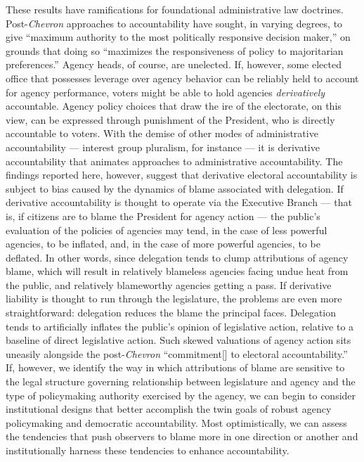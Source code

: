 \documentclass{article}
\begin{document}
These results have ramifications for foundational administrative law doctrines. Post-\emph{Chevron} approaches to accountability have sought, in varying degrees, to give ``maximum authority to the most politically responsive decision maker,'' on grounds that doing so ``maximizes the responsiveness of policy to majoritarian preferences.'' \citep[p. 56]{Stephenson2008} Agency heads, of course, are unelected. If, however, some elected office that possesses leverage over agency behavior can be reliably held to account for agency performance, voters might be able to hold agencies \emph{derivatively} accountable. Agency policy choices that draw the ire of the electorate, on this view, can be expressed through punishment of the President, who is directly accountable to voters. With the demise of other modes of administrative accountability --- interest group pluralism, for instance \citep{Bressman2003} --- it is derivative accountability that animates approaches to administrative accountability. The findings reported here, however, suggest that derivative electoral accountability is subject to bias caused by the dynamics of blame associated with delegation. If derivative accountability is thought to operate via the Executive Branch --- that is, if citizens are to blame the President for agency action --- the public's evaluation of the policies of agencies may tend, in the case of less powerful agencies, to be inflated, and, in the case of more powerful agencies, to be deflated. In other words, since delegation tends to clump attributions of agency blame, which will result in relatively blameless agencies facing undue heat from the public, and relatively blameworthy agencies getting a pass. If derivative liability is thought to run through the legislature, the problems are even more straightforward: delegation reduces the blame the principal faces. Delegation tends to artificially inflates the public's opinion of  legislative action, relative to a baseline of direct legislative action. Such skewed valuations of agency action sits uneasily alongside the post-\emph{Chevron} ``commitment[] to electoral accountability.'' \citep[p. 634]{Manning1996} If, however, we identify the way in which attributions of blame are sensitive to the legal structure governing relationship between legislature and agency and the type of policymaking authority exercised by the agency, we can begin to consider institutional designs that better accomplish the twin goals of robust agency policymaking and democratic accountability. Most optimistically, we can assess the tendencies that push observers to blame more in one direction or another and institutionally harness these tendencies to enhance accountability.
\end{document}
